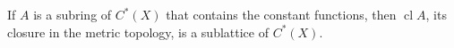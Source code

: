 If $A$ is a subring of $C^*(X)$ that contains the constant functions, then $\operatorname{cl} A$, its closure in the metric topology, is a sublattice of $C^*(X)$.
